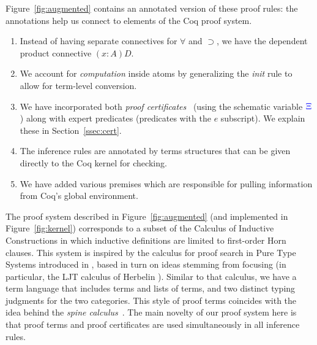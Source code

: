 Figure~\ref{fig:augmented} contains an annotated version of these
proof rules: the annotations help us connect to elements of the Coq
proof system.
\begin{enumerate}
  \item Instead of having separate connectives for $\forall$ and
    $\supset$, we have the dependent product connective $(x:A)D$. 
  \item We account for \emph{computation} inside atoms by generalizing
    the \emph{init} rule to allow for term-level conversion.
  \item We have incorporated both \emph{proof
  certificates}~\cite{chihani17jar} (using the schematic variable
    ${\color{blue}{\Xi}}$) along with expert predicates (predicates with the $e$
    subscript). We explain these in Section~\ref{ssec:cert}.
  \item The inference rules are  annotated by terms structures that
    can be given directly to the Coq kernel for checking.
  \item We have added various premises which are responsible for
    pulling information from Coq's global environment.
\end{enumerate}
The proof system described in Figure~\ref{fig:augmented} (and
implemented in Figure~\ref{fig:kernel}) corresponds to a subset of the Calculus
of Inductive Constructions in which inductive definitions are
limited to first-order Horn clauses.
%
This  system is inspired by the calculus for proof search in
Pure Type Systems introduced in \cite{LengrandDM06}, based in turn on
ideas stemming from focusing (in particular, the LJT calculus of
Herbelin \cite{Herbelin94}). Similar to that calculus, we have a
term language that includes terms and lists of terms, and two distinct
typing judgments for the two categories.
%
This style of  proof terms coincides with the idea behind the \emph{spine
  calculus}~\cite{Cervesato97tr}.  The main novelty of our proof
system here is that proof terms and proof certificates are used
simultaneously in all inference rules.

